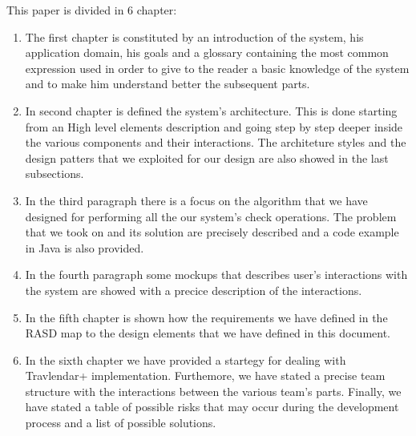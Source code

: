 This paper is divided in 6 chapter:
\begin{enumerate}
	\setlength{\leftskip}{0.5cm}
	\item The first chapter is constituted by an introduction of the system, his application domain, his goals and a glossary containing the most common expression used in order to give to the reader a basic knowledge of the system and to make him understand better the subsequent parts.
	
	\item In second chapter is defined the system's architecture. This is done starting from an High level elements description and going step by step deeper inside the various components and their interactions. The architeture styles and the design patters that we exploited for our design are also showed in the last subsections.
	
	\item In the third paragraph there is a focus on the algorithm that we have designed for performing all the our system's check operations. The problem that we took on and its solution are precisely described and a code example in Java is also provided.
	
	\item In the fourth paragraph some mockups that describes user's interactions with the system are showed with a precice description of the interactions.
	
	\item In the fifth chapter is shown how the requirements we have defined in the RASD map to the design elements that we have defined in this document.
	
	\item In the sixth chapter we have provided a startegy for dealing with Travlendar+ implementation. Furthemore, we have stated a precise team structure with the interactions between the various team's parts. Finally, we have stated a table of possible risks that may occur during the development process and a list of possible solutions.
\end{enumerate}